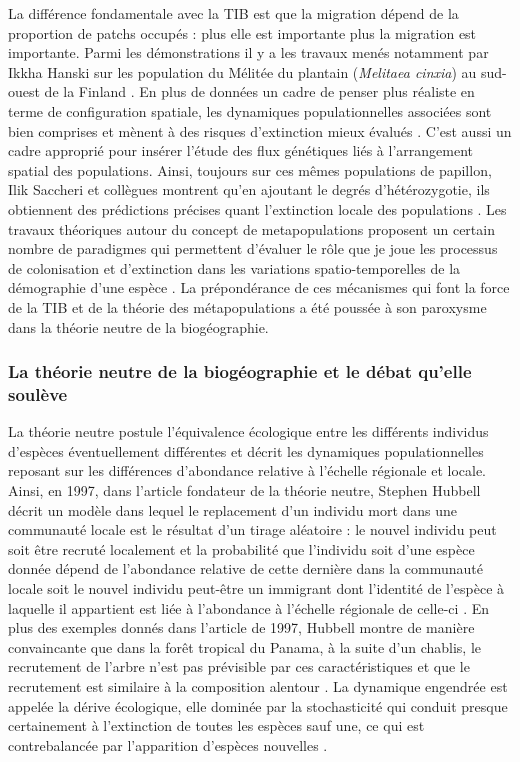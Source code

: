 La différence fondamentale avec la TIB est que la migration dépend de la
proportion de patchs occupés : plus elle est importante plus la
migration est importante. Parmi les démonstrations il y a les travaux
menés notamment par Ikkha Hanski sur les population du Mélitée du
plantain (\emph{Melitaea cinxia}) au sud-ouest de la Finland
\citep{Hanski1998}. En plus de données un cadre de penser plus réaliste
en terme de configuration spatiale, les dynamiques populationnelles
associées sont bien comprises et mènent à des risques d'extinction mieux
évalués \citep{Hanski1998}. C'est aussi un cadre approprié pour insérer
l'étude des flux génétiques liés à l'arrangement spatial des
populations. Ainsi, toujours sur ces mêmes populations de papillon, Ilik
Saccheri et collègues montrent qu'en ajoutant le degrés d'hétérozygotie,
ils obtiennent des prédictions précises quant l'extinction locale des
populations \citep{Saccheri1998}. Les travaux théoriques autour du
concept de metapopulations proposent un certain nombre de paradigmes qui
permettent d'évaluer le rôle que je joue les processus de colonisation
et d'extinction dans les variations spatio-temporelles de la démographie
d'une espèce \citep{Leibold2004}. La prépondérance de ces mécanismes qui
font la force de la TIB et de la théorie des métapopulations a été
poussée à son paroxysme dans la théorie neutre de la biogéographie.

\subsubsection*{La théorie neutre de la biogéographie et le débat
qu'elle
soulève}\label{la-thuxe9orie-neutre-de-la-bioguxe9ographie-et-le-duxe9bat-quelle-souluxe8ve}

La théorie neutre postule l'équivalence écologique entre les différents
individus d'espèces éventuellement différentes et décrit les dynamiques
populationnelles reposant sur les différences d'abondance relative à
l'échelle régionale et locale. Ainsi, en 1997, dans l'article fondateur
de la théorie neutre, Stephen Hubbell décrit un modèle dans lequel le
replacement d'un individu mort dans une communauté locale est le
résultat d'un tirage aléatoire : le nouvel individu peut soit être
recruté localement et la probabilité que l'individu soit d'une espèce
donnée dépend de l'abondance relative de cette dernière dans la
communauté locale soit le nouvel individu peut-être un immigrant dont
l'identité de l'espèce à laquelle il appartient est liée à l'abondance à
l'échelle régionale de celle-ci \citep{Hubbell1997}. En plus des
exemples donnés dans l'article de 1997, Hubbell montre de manière
convaincante que dans la forêt tropical du Panama, à la suite d'un
chablis, le recrutement de l'arbre n'est pas prévisible par ces
caractéristiques et que le recrutement est similaire à la composition
alentour \citep{Hubbell1999}. La dynamique engendrée est appelée la
dérive écologique, elle dominée par la stochasticité qui conduit presque
certainement à l'extinction de toutes les espèces sauf une, ce qui est
contrebalancée par l'apparition d'espèces nouvelles
\citep[\citet{Ricklefs2003}]{Hubbell2010}.

